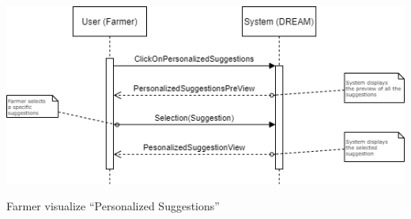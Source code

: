 \documentclass{article}
\begin{document}
\begin{center}
    \includegraphics[width=1\textwidth]{images/sequenceDiagrams/3. FarmerPersonalizedSuggestions.png}
    \par
    \caption{\label{fig:frog}Farmer visualize “Personalized Suggestions”}

    \newpage
    
    
    

\end{center}
\end{document}
